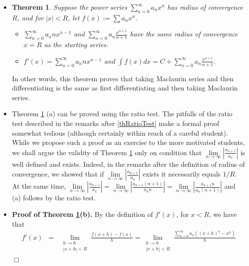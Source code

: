 \documentclass[12pt]{book}
\newenvironment{proof}[1][]{ \textbf{Proof#1.} }{$\Box$\medskip}
\newtheorem{theorem}{Theorem}[section]
\begin{document}
\begin{itemize}
\item \begin{theorem}\label{thDifferentiatingIntegratingPowerSeriesNonFormal}
Suppose the power series $\sum\limits_{n=0}^\infty a_n x^n$ has radius of convergence $R$, and for $|x|<R$, let $f(x):=\sum a_n x^n$. 
\begin{itemize}
\item[(a)] $\sum\limits_{n=0}^\infty a_n n x^{n-1}$ and $\sum\limits_{n=0}^\infty a_n\frac{x^{n+1}}{n+1}$ have the same radius of convergence $x=R$ as the starting series.
\item[(b)] $f'(x)=\sum\limits_{n=0}^\infty a_n n x^{n-1}$ and $\displaystyle\int f(x)dx= C+\sum\limits_{n=0}^\infty a_n\frac{x^{n+1}}{n+1} $.
\end{itemize}
\end{theorem}
In other words, this theorem proves that taking Maclaurin series and then differentiating is the same as first differentiating and then taking Maclaurin series.
\item Theorem \ref{thDifferentiatingIntegratingPowerSeriesNonFormal} (a) can be proved using the ratio test. The pitfalls of the ratio test described in the remarks after \ref{thRatioTest} make a formal proof somewhat tedious (although certainly within reach of a careful student). While we propose such a proof as an exercise to the more motivated students, we shall argue the validity of  Theorem \ref{thDifferentiatingIntegratingPowerSeriesNonFormal} only on condition that $\lim\limits_{n\to\infty} \left|\frac{a_{n+1}}{a_n}\right|$ is well defined and exists. Indeed, in the remarks after the definition of radius of convergence, we showed that if $\lim\limits_{n\to\infty} \left|\frac{a_{n+1}}{a_n}\right|$ exists it necessarily equals $1/R$. At the same time, $\lim\limits_{n\to\infty} \left|\frac{a_{n+1}}{a_n}\right| = \lim\limits_{n\to\infty} \left|\frac{a_{n+1}(n+1)}{a_n n}\right|= \lim\limits_{n\to\infty} \left|\frac{a_{n+1}n}{a_n (n+1)}\right|$ and (a) follows by the ratio test. 
\item
\begin{proof}[ of Theorem \ref{thDifferentiatingIntegratingPowerSeriesNonFormal}(b)]
By the definition of $f'(x)$, for $x<R$, we have that 
\begin{equation}\label{eqThDifferentiatingPowerSeriesProofeq1}
\begin{array}{rcl}
f'(x)&=&\displaystyle\lim\limits_{\substack{h\to 0\\|x+h|<R}} \frac{f(x+h)-f(x)}{h} = \lim\limits_{\substack{h\to 0\\|x+h|<R}} \frac{\sum\limits_{n=0}^{\infty} a_n\left( (x+h)^n-x^n \right) }{h} \\

\end{array}
\end{equation}
\end{proof}
\end{itemize}
\end{document}
